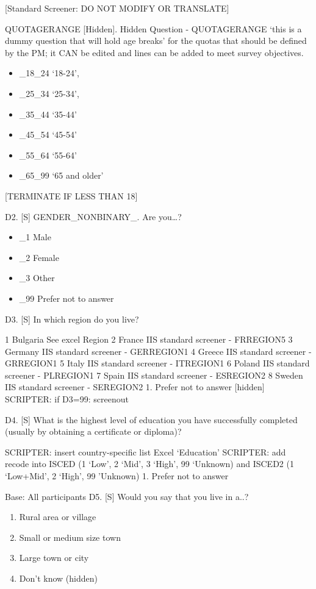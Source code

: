 \documentclass[
  12pt,
  a4paper,
]{article}
\providecommand{\tightlist}{%
  \setlength{\itemsep}{0pt}\setlength{\parskip}{0pt}}
\begin{document}
{[}Standard Screener: DO NOT MODIFY OR TRANSLATE{]}

QUOTAGERANGE {[}Hidden{]}. Hidden Question - QUOTAGERANGE `this is a dummy question that will hold age breaks' for the quotas that should be defined by the PM; it CAN be edited and lines can be added to meet survey objectives.

\begin{itemize}
\tightlist
\item
  \_18\_24 `18-24',
\item
  \_25\_34 `25-34',
\item
  \_35\_44 `35-44'
\item
  \_45\_54 `45-54'
\item
  \_55\_64 `55-64'
\item
  \_65\_99 `65 and older'
\end{itemize}

{[}TERMINATE IF LESS THAN 18{]}

D2. {[}S{]} GENDER\_NONBINARY\_. Are you\ldots?

\begin{itemize}
\tightlist
\item
  \_1 Male
\item
  \_2 Female
\item
  \_3 Other
\item
  \_99 Prefer not to answer
\end{itemize}

D3. {[}S{]} In which region do you live?

1 Bulgaria See excel Region
2 France IIS standard screener - FRREGION5
3 Germany IIS standard screener - GERREGION1
4 Greece IIS standard screener - GRREGION1
5 Italy IIS standard screener - ITREGION1
6 Poland IIS standard screener - PLREGION1
7 Spain IIS standard screener - ESREGION2
8 Sweden IIS standard screener - SEREGION2
1. Prefer not to answer {[}hidden{]}\\
SCRIPTER: if D3=99: screenout

D4. {[}S{]} What is the highest level of education you have successfully completed (usually by obtaining a certificate or diploma)?

SCRIPTER: insert country-specific list Excel `Education'
SCRIPTER: add recode into ISCED (1 `Low', 2 `Mid', 3 `High', 99 `Unknown) and ISCED2 (1 `Low+Mid', 2 `High', 99 'Unknown)
1. Prefer not to answer

Base: All participants
D5. {[}S{]} Would you say that you live in a..?

\begin{enumerate}
\def\labelenumi{\arabic{enumi}.}
\tightlist
\item
  Rural area or village\\
\item
  Small or medium size town\\
\item
  Large town or city\\
\item
  Don't know (hidden)
\end{enumerate}
\end{document}
